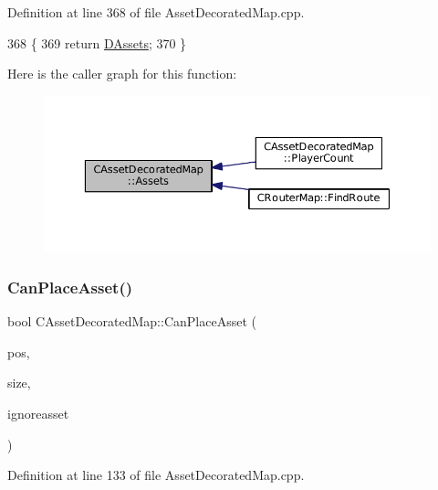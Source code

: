Definition at line 368 of file Asset\+Decorated\+Map.\+cpp.


\begin{DoxyCode}
368                                                                                 \{
369     \textcolor{keywordflow}{return} \hyperlink{classCAssetDecoratedMap_a94eeed5b16141169b1ba6cb3842055aa}{DAssets};
370 \}
\end{DoxyCode}
Here is the caller graph for this function\+:\nopagebreak
\begin{figure}[H]
\begin{center}
\leavevmode
\includegraphics[width=350pt]{classCAssetDecoratedMap_a2f4d2597697593197567877900d55c52_icgraph}
\end{center}
\end{figure}
\hypertarget{classCAssetDecoratedMap_ad4baef4b84b066847459e45205c8575c}{}\label{classCAssetDecoratedMap_ad4baef4b84b066847459e45205c8575c} 
\subsubsection{\texorpdfstring{Can\+Place\+Asset()}{CanPlaceAsset()}}
{\footnotesize\ttfamily bool C\+Asset\+Decorated\+Map\+::\+Can\+Place\+Asset (\begin{DoxyParamCaption}\item[{const \hyperlink{classCPosition}{C\+Position} \&}]{pos,  }\item[{int}]{size,  }\item[{std\+::shared\+\_\+ptr$<$ \hyperlink{classCPlayerAsset}{C\+Player\+Asset} $>$}]{ignoreasset }\end{DoxyParamCaption})}



Definition at line 133 of file Asset\+Decorated\+Map.\+cpp.



